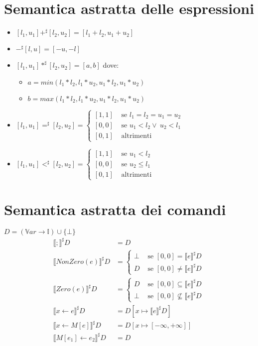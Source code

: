 \documentclass[a4paper, 10pt]{report}
\begin{document}
\section*{Semantica astratta delle espressioni}
\begin{itemize}
	\item $[l_1, u_1] +^\sharp [l_2, u_2] = [l_1 + l_2, u_1 + u_2]$
	\item $-^\sharp[l, u] = [-u, -l]$
	\item $[l_1, u_1] *^\sharp [l_2, u_2] = [a, b]$ dove:
	\begin{itemize}
		\item $a=min(l_1*l_2, l_1*u_2, u_1*l_2, u_1*u_2)$
		\item $b=max(l_1*l_2, l_1*u_2, u_1*l_2, u_1*u_2)$
	\end{itemize}
	\item $[l_1, u_1] =^\sharp [l_2, u_2] =
	\begin{cases}
	[1, 1] &\text{ se } l_1=l_2=u_1=u_2\\
	[0, 0] &\text{ se } u_1 < l_2 \lor ~u_2 < l_1\\
	[0, 1] &\text{ altrimenti }
	\end{cases}$
	\item $[l_1, u_1] <^\sharp [l_2, u_2] =
	\begin{cases}
	[1, 1] &\text{ se } u_1<l_2 \\
	[0, 0] &\text{ se } u_2 \leq l_1 \\
	[0, 1] &\text{ altrimenti }
	\end{cases}$
\end{itemize}


\section*{Semantica astratta dei comandi}
$D = (\mathbb{V}ar \rightarrow \mathbb{I}) \cup \{\bot\}$
\begin{align*}
\llbracket ; \rrbracket^\sharp D &= D\\
\llbracket NonZero(e) \rrbracket^\sharp D &=
\begin{cases}
\bot &\text{ se } [0, 0] = \llbracket e \rrbracket^\sharp D \\
D &\text{ se } [0, 0] \neq \llbracket e \rrbracket^\sharp D~
\end{cases}\\
\llbracket Zero(e) \rrbracket^\sharp D &=
\begin{cases}
D &\text{ se } [0, 0] \subseteq \llbracket e \rrbracket^\sharp D~\\
\bot &\text{ se } [0, 0] \not \subseteq \llbracket e \rrbracket^\sharp D~
\end{cases}\\
\llbracket x\leftarrow e \rrbracket^\sharp D &= D[x\mapsto \llbracket e\rrbracket^\sharp D]\\
\llbracket x\leftarrow M[e] \rrbracket^\sharp D &= D[x\mapsto [-\infty, +\infty]]\\
\llbracket M[e_1]\leftarrow e_2 \rrbracket^\sharp D &= D
\end{align*}
\end{document}
